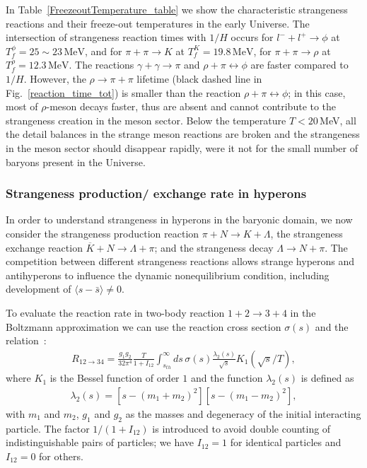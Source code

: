 In Table~\ref{FreezeoutTemperature_table} we show the characteristic strangeness reactions and their freeze-out temperatures in the early Universe. The intersection of strangeness reaction times with $1/H$ occurs for $l^-+l^+\rightarrow\phi$ at $T_f^\phi=25\sim23\,\mathrm{MeV}$, and for $\pi+\pi\rightarrow K$ at $T_f^K=19.8\,\mathrm{MeV}$, for $\pi+\pi\rightarrow\rho$ at $T_f^\rho=12.3\,\mathrm{MeV}$. The reactions $\gamma+\gamma\rightarrow\pi$ and $\rho+\pi\leftrightarrow\phi$ are faster compared to $1/H$. However, the $\rho\to\pi+\pi$ lifetime (black dashed line in Fig.~\ref{reaction_time_tot}) is smaller than the reaction $\rho+\pi\leftrightarrow\phi$; in this case, most of $\rho$-meson decays faster, thus are absent and cannot contribute to the strangeness creation in the meson sector. Below the temperature $T<20$\,MeV, all the detail balances in the strange meson reactions are broken and the strangeness in the meson sector should disappear rapidly, were it not for the small number of baryons present in the Universe.






\subsubsection{Strangeness production/ exchange rate in hyperons}
In order to understand strangeness in hyperons in the baryonic domain, we now consider the strangeness production reaction $\pi +N\rightarrow K+\Lambda$, the strangeness exchange reaction $\overline{K}+N\rightarrow \Lambda+\pi$; and the strangeness decay $\Lambda\rightarrow N+\pi$. The competition between different strangeness reactions allows strange hyperons and antihyperons to influence the dynamic nonequilibrium condition, including development of $\langle s-\bar s\rangle \ne 0$. %

To evaluate the reaction rate in two-body reaction $1+2\rightarrow3+4$ in the Boltzmann approximation we can use the reaction cross section $\sigma(s)$ and the relation~\cite{Letessier:2002ony}:
\begin{align}
R_{12\rightarrow34}=\frac{g_1g_2}{32\pi^4}\frac{T}{1+I_{12}}\!\!\int^\infty_{s_{th}}\!\!\!\!ds\,\sigma(s)\frac{\lambda_2(s)}{\sqrt{s}}\!K_1\!\!\left({\sqrt{s}}/{T}\right),
\end{align}
where $K_1$ is the Bessel function of order $1$ and the function $\lambda_2(s)$ is defined as
\begin{align}
\lambda_2(s)=\left[s-(m_1+m_2)^2\right]\left[s-(m_1-m_2)^2\right],
\end{align}
with $m_1$ and $m_2$, $g_1$ and $g_2$ as the masses and degeneracy of the initial interacting particle. The factor $1/(1+I_{12})$ is introduced to avoid double counting of indistinguishable pairs of particles; we have $I_{12}=1$ for identical particles and $I_{12}=0$ for others. 

